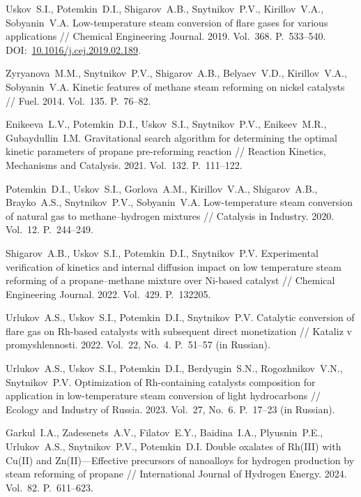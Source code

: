 \documentclass{cmi}
\begin{document}
\begin{biblio_lat}

Uskov~S.I., Potemkin~D.I., Shigarov~A.B., Snytnikov~P.V., Kirillov~V.A., Sobyanin~V.A. Low-temperature steam conversion of flare gases for various applications // Chemical Engineering Journal. 2019. Vol.~368. P.~533--540. DOI:~\href{http://dx.doi.org/10.1016/j.cej.2019.02.189}{10.1016/j.cej.2019.02.189}.

Zyryanova~M.M., Snytnikov~P.V., Shigarov~A.B., Belyaev~V.D., Kirillov~V.A., Sobyanin~V.A. Kinetic features of methane steam reforming on nickel catalysts // Fuel. 2014. Vol.~135. P.~76--82.

Enikeeva~L.V., Potemkin~D.I., Uskov~S.I., Snytnikov~P.V., Enikeev~M.R., Gubaydullin~I.M. Gravitational search algorithm for determining the optimal kinetic parameters of propane pre-reforming reaction // Reaction Kinetics, Mechanisms and Catalysis. 2021. Vol.~132. P.~111--122.

Potemkin~D.I., Uskov~S.I., Gorlova~A.M., Kirillov~V.A., Shigarov~A.B., Brayko~A.S., Snytnikov~P.V., Sobyanin~V.A. Low-temperature steam conversion of natural gas to methane--hydrogen mixtures // Catalysis in Industry. 2020. Vol.~12. P.~244--249.

Shigarov~A.B., Uskov~S.I., Potemkin~D.I., Snytnikov~P.V. Experimental verification of kinetics and internal diffusion impact on low temperature steam reforming of a propane--methane mixture over Ni-based catalyst // Chemical Engineering Journal. 2022. Vol.~429. P.~132205.

Urlukov~A.S., Uskov~S.I., Potemkin~D.I., Snytnikov~P.V. Catalytic conversion of flare gas on Rh-based catalysts with subsequent direct monetization // Kataliz v promyshlennosti. 2022. Vol.~22, No.~4. P.~51--57 (in Russian).

Urlukov~A.S., Uskov~S.I., Potemkin~D.I., Berdyugin~S.N., Rogozhnikov~V.N., Snytnikov~P.V. Optimization of Rh-containing catalysts composition for application in low-temperature steam conversion of light hydrocarbons // Ecology and Industry of Russia. 2023. Vol.~27, No.~6. P.~17--23 (in Russian).

Garkul~I.A., Zadesenets~A.V., Filatov~E.Y., Baidina~I.A., Plyusnin~P.E., Urlukov~A.S., Snytnikov~P.V., Potemkin~D.I. Double oxalates of Rh(III) with Cu(II) and Zn(II)---Effective precursors of nanoalloys for hydrogen production by steam reforming of propane // International Journal of Hydrogen Energy. 2024. Vol.~82. P.~611--623.


\end{biblio_lat}
\end{document}
